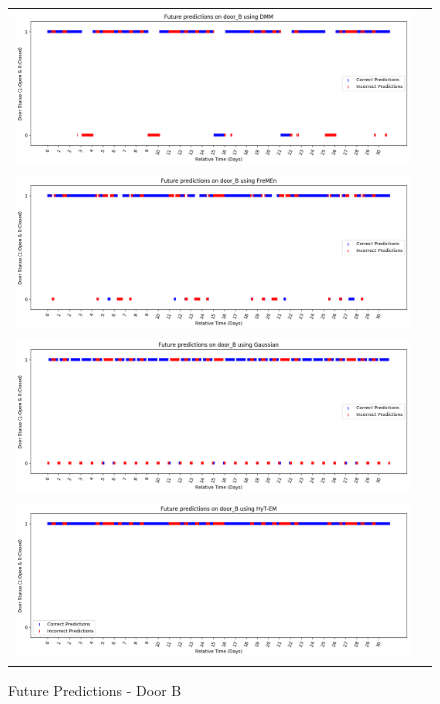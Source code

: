 \begin{center}
\begin{figure}[!Hp]
  \begin{tabular}{cc}
    {\includegraphics[width = 6in]{images/results/Future_door_B_DMM.png}} \\
    {\includegraphics[width = 6in]{images/results/Future_door_B_FreMEn.png}} \\
    {\includegraphics[width = 6in]{images/results/Future_door_B_Gaussian.png}} \\
    {\includegraphics[width = 6in]{images/results/Future_door_B_HyT-EM.png}} \\
  \end{tabular}
  \caption{Future Predictions - Door B}
  \label{figure:future_door_B}
\end{figure}\\ \\


\end{center}
